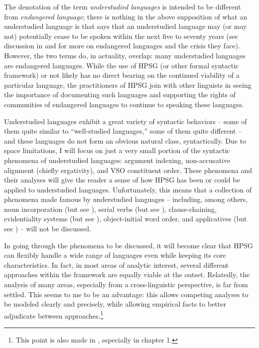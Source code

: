 \documentclass[output=paper]{langsci/langscibook}
\begin{document}
{The denotation of the term \textit{understudied languages} is intended to be different from \textit{endangered language}; there is nothing in the above supposition of what an understudied language is that says that an understudied language may (or may not) potentially cease to be spoken within the next five to seventy years (see discussion in \citealt{krauss92} and \citealt{SL13} for more on endangered languages and the crisis they face).  However, the two terms do, in actuality, overlap: many understudied languages are endangered languages. While the use of HPSG (or other formal syntactic framework) or not likely has no direct bearing on the continued viability of a particular language, the practitioners of HPSG join with other linguists in seeing the importance of documenting such languages and supporting the rights of communities of endangered languages to continue to speaking these languages.       

Understudied languages exhibit a great variety of syntactic behaviors -- some of them quite similar to ``well-studied languages,'' some of them quite different -- and these languages do not form an obvious natural class, syntactically. Due to space limitations, I will focus on just a very small portion of the syntactic phenomena of understudied languages: argument indexing, non-accusative alignment (chiefly ergativity), and VSO constituent order. These phenomena and their analyses will give the reader a sense of how HPSG has been or could be applied to understudied languages. Unfortunately, this means that a collection of phenomena made famous by understudied languages -- including, among others, noun incorporation (but see \citealt{malouf99,runara03,ball05afla,ball05hpsg,ball08thesis}), serial verbs (but see \citealt{muansuwan01,muansuwan02,KDHB2007a,ML2009a,lee14}), clause-chaining, evidentiality systems (but see \citealt{lee12}), object-initial word order, and applicatives (but see \citealt{runara03,ball08thesis,ball10}) -- will not be discussed. 

In going through the phenomena to be discussed, it will become clear that HPSG can flexibly handle a wide range of languages even while keeping its core characteristics. In fact, in most areas of analytic interest, several different approaches within the framework are equally viable at the outset. Relatedly, the analysis of many areas, especially from a cross-linguistic perspective, is far from settled. This seems to me to be an advantage: this allows competing analyses to be modeled clearly and precisely, while allowing empirical facts to better adjudicate between approaches.\footnote{This point is also made in \citealt{fokkens14}, especially in chapter 1.}

}
\end{document}

